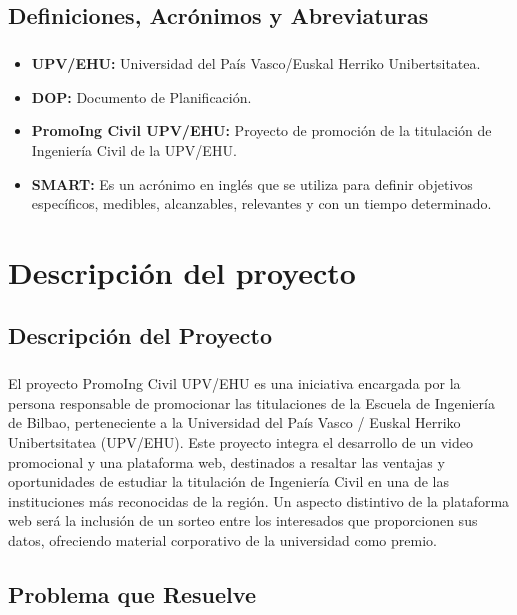\documentclass{report}
\begin{document}
        \section{Definiciones, Acrónimos y Abreviaturas}
            \paragraph*{}
            \begin{itemize}
                \item \textbf{UPV/EHU:} Universidad del País Vasco/Euskal Herriko Unibertsitatea.
                \item \textbf{DOP:} Documento de Planificación.
                \item \textbf{PromoIng Civil UPV/EHU:} Proyecto de promoción de la titulación de Ingeniería Civil de la UPV/EHU.
                \item \textbf{SMART:} Es un acrónimo en inglés que se utiliza para definir objetivos específicos, medibles, alcanzables, relevantes y con un tiempo determinado.
            \end{itemize}
    \chapter{Descripción del proyecto}
        \section{Descripción del Proyecto}
            \paragraph*{}
            El proyecto PromoIng Civil UPV/EHU es una iniciativa encargada por la persona responsable de promocionar las titulaciones de la Escuela de Ingeniería de Bilbao, perteneciente a la Universidad del País Vasco / Euskal Herriko Unibertsitatea (UPV/EHU). Este proyecto integra el desarrollo de un video promocional y una plataforma web, destinados a resaltar las ventajas y oportunidades de estudiar la titulación de Ingeniería Civil en una de las instituciones más reconocidas de la región. Un aspecto distintivo de la plataforma web será la inclusión de un sorteo entre los interesados que proporcionen sus datos, ofreciendo material corporativo de la universidad como premio.
        \section{Problema que Resuelve}
\end{document}
